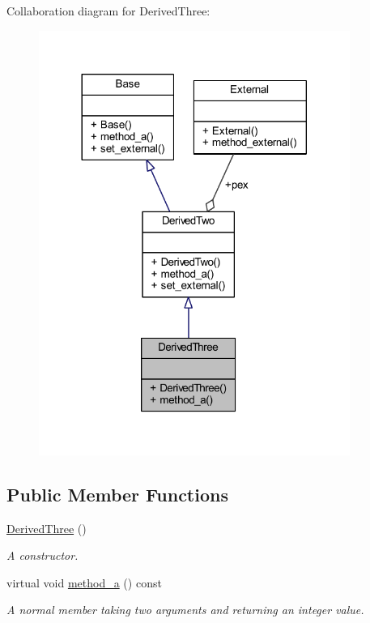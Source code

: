 Collaboration diagram for Derived\+Three\+:
\nopagebreak
\begin{figure}[H]
\begin{center}
\leavevmode
\includegraphics[width=288pt]{class_derived_three__coll__graph}
\end{center}
\end{figure}
\subsection*{Public Member Functions}
\begin{DoxyCompactItemize}
\item 
\hyperlink{class_derived_three_a7787b8ff6ade268d734edcdea3df5a2b}{Derived\+Three} ()
\begin{DoxyCompactList}\small\item\em A constructor. \end{DoxyCompactList}\item 
virtual void \hyperlink{class_derived_three_a74d2afff499ae551a424aa5d1da14620}{method\+\_\+a} () const
\begin{DoxyCompactList}\small\item\em A normal member taking two arguments and returning an integer value. \end{DoxyCompactList}\end{DoxyCompactItemize}
